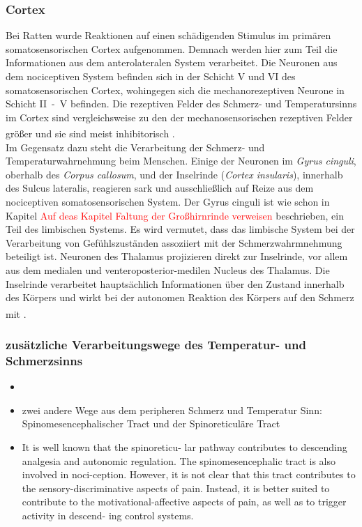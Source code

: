 \documentclass[12pt,a4paper,pdftex]{article}
\begin{document}
\subsubsection*{Cortex}
Bei Ratten wurde Reaktionen auf einen schädigenden Stimulus im primären somatosensorischen Cortex aufgenommen. Demnach werden hier zum Teil die Informationen aus dem anterolateralen System verarbeitet. Die Neuronen aus dem nociceptiven System befinden sich in der Schicht V und VI des somatosensorischen Cortex, wohingegen sich die mechanorezeptiven Neurone in Schicht II~-~V befinden. Die rezeptiven Felder des Schmerz- und Temperatursinns im Cortex sind vergleichsweise zu den der mechanosensorischen rezeptiven Felder größer und sie sind meist inhibitorisch \textsuperscript{\cite[25]{paxinos2014rat}}.
\\
\noindent Im Gegensatz dazu steht die Verarbeitung der Schmerz- und  Temperaturwahrnehmung beim Menschen. Einige der Neuronen im \textit{Gyrus cinguli}, oberhalb des \textit{Corpus callosum}, und der Inselrinde (\textit{Cortex insularis}), innerhalb des Sulcus lateralis, reagieren sark und ausschließlich auf Reize aus dem nociceptiven somatosensorischen System. Der Gyrus cinguli ist wie schon in Kapitel \textcolor{red}{Auf deas Kapitel Faltung der Großhirnrinde verweisen} beschrieben, ein Teil des limbischen Systems. Es wird vermutet, dass das limbische System bei der Verarbeitung von Gefühlszuständen assoziiert mit der Schmerzwahrmnehmung beteiligt ist. Neuronen des Thalamus projizieren direkt zur Inselrinde, vor allem aus dem medialen und venteroposterior-medilen Nucleus des Thalamus. Die Inselrinde verarbeitet hauptsächlich Informationen über den Zustand innerhalb des Körpers und wirkt bei der autonomen Reaktion des Körpers auf den Schmerz mit \textsuperscript{\cite[24]{kandel2013principles}}.

\subsubsection*{zusätzliche Verarbeitungswege des Temperatur- und Schmerzsinns}

\begin{itemize}
    \item \item zwei andere Wege aus dem peripheren Schmerz und Temperatur Sinn: Spinomesencephalischer Tract und der Spinoreticuläre Tract
    \item It is well known that the spinoreticu-
    lar pathway contributes to descending analgesia and
    autonomic regulation. The spinomesencephalic tract is also involved in noci-ception. However, it is not clear that this tract contributes
    to the sensory-discriminative aspects of pain. Instead, it
    is better suited to contribute to the motivational-affective
    aspects of pain, as well as to trigger activity in descend-
    ing control systems. \cite{paxinos2014rat}
\end{itemize}
\end{document}
